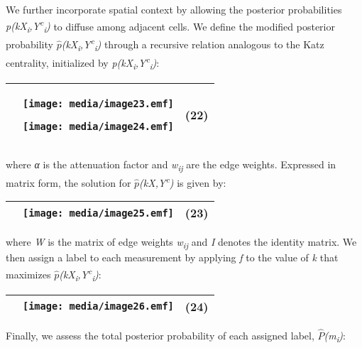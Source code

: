 We further incorporate spatial context by allowing the posterior probabilities \emph{p(k\textbar{}X\textsubscript{i},Y\textsuperscript{c}\textsubscript{i})} to diffuse among adjacent cells. We define the modified posterior probability \(\widehat{p}\)\emph{(k\textbar{}X\textsubscript{i},Y\textsuperscript{c}\textsubscript{i})} through a recursive relation analogous to the Katz centrality, initialized by \emph{p(k\textbar{}X\textsubscript{i},Y\textsuperscript{c}\textsubscript{i})}:

\begin{longtable}[]{@{}lll@{}}
\toprule
\begin{minipage}[t]{0.32\columnwidth}\raggedright\strut
\strut
\end{minipage} & \begin{minipage}[t]{0.32\columnwidth}\raggedright\strut
\texttt{[image: media/image23.emf]}

\texttt{[image: media/image24.emf]}\strut
\end{minipage} & \begin{minipage}[t]{0.32\columnwidth}\raggedright\strut
(22)\strut
\end{minipage}\tabularnewline
\bottomrule
\end{longtable}

where \emph{α} is the attenuation factor and \emph{w\textsubscript{ij}} are the edge weights. Expressed in matrix form, the solution for \(\widehat{p}\)\emph{(k\textbar{}X,Y\textsuperscript{c})} is given by:

\begin{longtable}[]{@{}lll@{}}
\toprule
& \texttt{[image: media/image25.emf]} & (23)\tabularnewline
\bottomrule
\end{longtable}

where \emph{W} is the matrix of edge weights \emph{w\textsubscript{ij}} and \emph{I} denotes the identity matrix. We then assign a label to each measurement by applying \emph{f} to the value of \emph{k} that maximizes \(\widehat{p}\)\emph{(k\textbar{}X\textsubscript{i},Y\textsuperscript{c}\textsubscript{i})}:

\begin{longtable}[]{@{}lll@{}}
\toprule
& \texttt{[image: media/image26.emf]} & (24)\tabularnewline
\bottomrule
\end{longtable}

Finally, we assess the total posterior probability of each assigned label, \(\widehat{P}\)\emph{(m\textsubscript{i})}:

